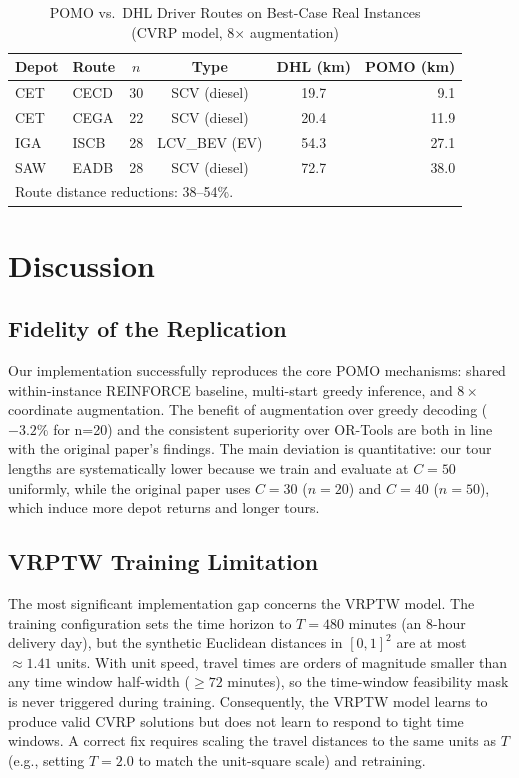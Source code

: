 \documentclass[conference]{IEEEtran}
\begin{document}
\begin{table}[t]
\caption{POMO vs.\ DHL Driver Routes on Best-Case Real Instances\\
  {\small (CVRP model, 8$\times$ augmentation)}}
\label{tab:realworld}
\centering
\begin{tabular}{llcccr}
\toprule
Depot & Route & $n$ & Type & DHL (km) & POMO (km) \\
\midrule
CET & CECD & 30 & SCV (diesel) & 19.7 & 9.1 \\
CET & CEGA & 22 & SCV (diesel) & 20.4 & 11.9 \\
IGA & ISCB & 28 & LCV\_BEV (EV) & 54.3 & 27.1 \\
SAW & EADB & 28 & SCV (diesel) & 72.7 & 38.0 \\
\bottomrule
\multicolumn{4}{l}{\small Route distance reductions: 38--54\%.} \\
\end{tabular}
\end{table}

\section{Discussion}

\subsection{Fidelity of the Replication}

Our implementation successfully reproduces the core POMO mechanisms: shared
within-instance REINFORCE baseline, multi-start greedy inference, and
$8\times$ coordinate augmentation. The benefit of augmentation over greedy
decoding ($-3.2\%$ for n=20) and the consistent superiority over OR-Tools
are both in line with the original paper's findings. The main deviation is
quantitative: our tour lengths are systematically lower because we train and
evaluate at $C=50$ uniformly, while the original paper uses $C=30$ ($n=20$)
and $C=40$ ($n=50$), which induce more depot returns and longer tours.

\subsection{VRPTW Training Limitation}

The most significant implementation gap concerns the VRPTW model. The
training configuration sets the time horizon to $T=480$ minutes (an 8-hour
delivery day), but the synthetic Euclidean distances in $[0,1]^2$ are at
most $\approx 1.41$ units. With unit speed, travel times are orders of
magnitude smaller than any time window half-width ($\ge 72$ minutes), so the
time-window feasibility mask is never triggered during training. Consequently,
the VRPTW model learns to produce valid CVRP solutions but does not learn to
respond to tight time windows. A correct fix requires scaling the travel
distances to the same units as $T$ (e.g., setting $T=2.0$ to match the
unit-square scale) and retraining.
\end{document}
